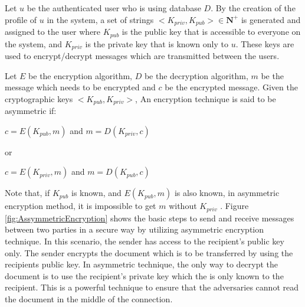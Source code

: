 		\begin{defn}
			Let $u$ be the authenticated user who is using database $D$. By the creation of the profile of $u$ in the system, a set of strings $<K_{priv}, K_{pub}> \in \mathbf{N}^+$ is generated and assigned to the user where $K_{pub}$ is the public key that is accessible to everyone on the system, and $K_{priv}$ is the private key that is known only to $u$. These keys are used to encrypt/decrypt messages which are transmitted between the users\cite{stallings2017cryptography}.
		\label{dfn:cryptographic_keys}
		\end{defn}
		\begin{defn}
			Let $E$ be the encryption algorithm, $D$ be the decryption algorithm, $m$ be the message which needs to be encrypted and $c$ be the encrypted message. Given the cryptographic keys $<K_{pub}, K_{priv}>$, An encryption technique is said to be asymmetric if:
			\begin{center}
				$c = E(K_{pub},m)$ and  $m = D(K_{priv},c)$
			\end{center}
			or
			\begin{center}
				$c = E(K_{priv},m)$ and  $m = D(K_{pub},c)$
			\end{center}
		\label{dfn:assymetric_encryption}
		\end{defn}

		Note that, if $K_{pub}$ is known, and $E(K_{pub},m)$ is also known, in asymmetric encryption method, it is impossible to get $m$ without $K_{priv}$ \cite{stallings2017cryptography}.
		Figure \ref{fig:AssymmetricEncryption} shows the basic steps to send and receive messages between two parties in a secure way by utilizing asymmetric encryption technique. In this scenario, the sender has access to the recipient's public key only. The sender encrypts the document which is to be transferred by using the recipients public key. In asymmetric technique, the only way to decrypt the document is to use the recipient's private key which the is only known to the recipient. This is a powerful technique to ensure that the adversaries cannot read the document in the middle of the connection.

